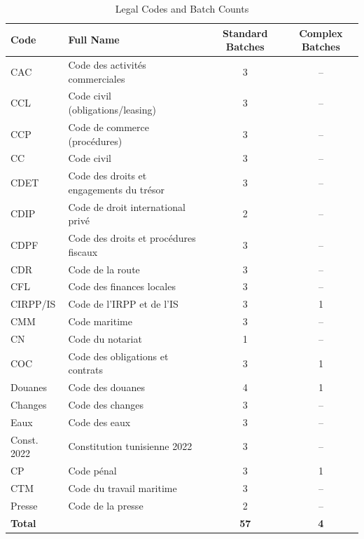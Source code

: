 \renewcommand{\arraystretch}{1.3}
\begin{table}[H]
\centering
\caption{Legal Codes and Batch Counts}
\label{tab:annex-codes}
\begin{tabular}{|p{1.8cm}|p{6.5cm}|c|c|}
\hline
\textbf{Code} & \textbf{Full Name} & \textbf{Standard Batches} & \textbf{Complex Batches} \\
\hline
CAC   & Code des activités commerciales          & 3 & -- \\
\hline
CCL   & Code civil (obligations/leasing)         & 3 & -- \\
\hline
CCP   & Code de commerce (procédures)            & 3 & -- \\
\hline
CC    & Code civil                               & 3 & -- \\
\hline
CDET  & Code des droits et engagements du trésor & 3 & -- \\
\hline
CDIP  & Code de droit international privé        & 2 & -- \\
\hline
CDPF  & Code des droits et procédures fiscaux    & 3 & -- \\
\hline
CDR   & Code de la route                         & 3 & -- \\
\hline
CFL   & Code des finances locales                & 3 & -- \\
\hline
CIRPP/IS & Code de l'IRPP et de l'IS             & 3 & 1 \\
\hline
CMM   & Code maritime                            & 3 & -- \\
\hline
CN    & Code du notariat                         & 1 & -- \\
\hline
COC   & Code des obligations et contrats         & 3 & 1 \\
\hline
Douanes & Code des douanes                       & 4 & 1 \\
\hline
Changes & Code des changes                       & 3 & -- \\
\hline
Eaux  & Code des eaux                            & 3 & -- \\
\hline
Const. 2022 & Constitution tunisienne 2022       & 3 & -- \\
\hline
CP    & Code pénal                               & 3 & 1 \\
\hline
CTM   & Code du travail maritime                 & 3 & -- \\
\hline
Presse & Code de la presse                       & 2 & -- \\
\hline
\textbf{Total} & & \textbf{57} & \textbf{4} \\
\hline
\end{tabular}
\end{table}

